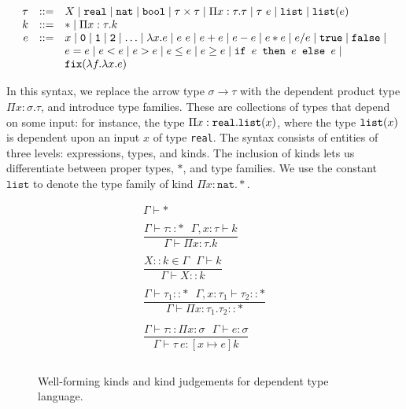  \[
\begin{array}{rcl}
\tau &::=& X \mid \texttt{real} \mid \texttt{nat} \mid \texttt{bool} \mid \tau \times \tau \mid \Pi x:\tau.\tau
\mid \tau \ e \mid \texttt{list} \mid \texttt{list}(e) \\
k &::=& * \mid \Pi x : \tau.k \\
e &::=& x  \mid \texttt{0} \mid \texttt{1} \mid \texttt{2} \mid \dotsc \mid \lambda x.e \mid e \ e \mid e + e \mid e - e \mid  e  *  e \mid e / e \mid \texttt{true} \mid \texttt{false} \mid \\
  && e  =  e \mid e < e \mid e > e \mid e \leq e \mid e \geq e \mid 
     \texttt{if } e \texttt{ then } e \texttt{ else } e \mid \\
     && \texttt{fix}(\lambda f. \lambda x.e) 
\end{array}
\]

In this syntax, we replace the arrow type $\sigma \rightarrow \tau$ with the dependent product type
$\Pi x:\sigma.\tau$, and introduce type families. These are collections of types that depend on some input: for instance,
the type $\Pi x:\texttt{real}.\texttt{list}(x)$, where the type $\texttt{list}(x)$ is dependent upon an input $x$ of type \texttt{real}.
The syntax consists of entities of three levels: expressions, types, and kinds. The inclusion of kinds lets us
differentiate between proper types, $*$, and type families. We use the constant $\texttt{list}$ to denote the type family of kind
$\Pi x:\texttt{nat}.*$.

\begin{figure}
\[
\begin{array}{c}
\Gamma \vdash * \\ \\
\dfrac{\Gamma \vdash \tau :: * \ \ \ \Gamma,x:\tau \vdash k}{\Gamma \vdash \Pi x:\tau.k} \\ \\
\dfrac{X :: k \in \Gamma \ \ \ \Gamma \vdash k}{\Gamma \vdash X :: k} \\ \\
\dfrac{\Gamma \vdash \tau_1 :: * \ \ \ \Gamma, x:\tau_1 \vdash \tau_2 :: *}{\Gamma \vdash \Pi x:\tau_1.\tau_2 :: *} \\ \\
\dfrac{\Gamma \vdash \tau :: \Pi x:\sigma \ \ \ \Gamma \vdash e : \sigma}{\Gamma \vdash \tau \ e : [x \mapsto e]k} \\ \\
\end{array}
\]
\caption{Well-forming kinds and kind judgements for dependent type language.}
\end{figure}

